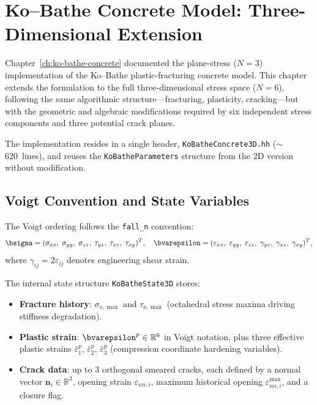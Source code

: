 
\chapter{Ko--Bathe Concrete Model: Three-Dimensional Extension}
\label{ch:ko-bathe-3d}

Chapter~\ref{ch:ko-bathe-concrete} documented the plane-stress ($N\!=\!3$)
implementation of the Ko--Bathe plastic-fracturing concrete model.  This
chapter extends the formulation to the full three-dimensional stress space
($N\!=\!6$), following the same algorithmic structure---fracturing, plasticity,
cracking---but with the geometric and algebraic modifications required by six
independent stress components and three potential crack planes.

The implementation resides in a single header,
\texttt{KoBatheConcrete3D.hh} ($\sim$620~lines), and reuses the \texttt{KoBatheParameters}
structure from the 2D version without modification.

\section{Voigt Convention and State Variables}
\label{sec:kb3d-voigt}

The Voigt ordering follows the \texttt{fall\_n} convention:
\begin{equation}
  \bsigma = (\sigma_{xx},\;\sigma_{yy},\;\sigma_{zz},\;
              \tau_{yz},\;\tau_{xz},\;\tau_{xy})^T, \quad
  \bvarepsilon = (\varepsilon_{xx},\;\varepsilon_{yy},\;\varepsilon_{zz},\;
                   \gamma_{yz},\;\gamma_{xz},\;\gamma_{xy})^T,
  \label{eq:voigt-3d}
\end{equation}
where $\gamma_{ij} = 2\varepsilon_{ij}$ denotes engineering shear strain.

The internal state structure \texttt{KoBatheState3D} stores:
\begin{itemize}
  \item \textbf{Fracture history}: $\sigma_{o,\max}$ and $\tau_{o,\max}$
        (octahedral stress maxima driving stiffness degradation).
  \item \textbf{Plastic strain}: $\bvarepsilon^p \in \mathbb{R}^6$ in Voigt
        notation, plus three effective plastic strains $\bar\varepsilon^p_1$,
        $\bar\varepsilon^p_2$, $\bar\varepsilon^p_3$ (compression coordinate
        hardening variables).
  \item \textbf{Crack data}: up to 3 orthogonal smeared cracks, each defined
        by a normal vector $\mathbf{n}_i \in \mathbb{R}^3$, opening strain
        $\varepsilon_{nn,i}$, maximum historical opening
        $\varepsilon_{nn,i}^{\max}$, and a closure flag.
\end{itemize}


